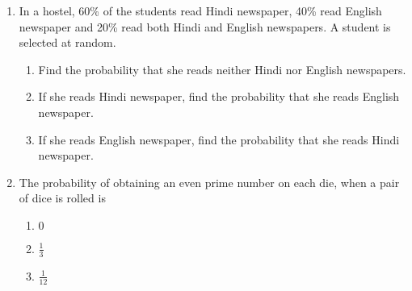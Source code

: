 \begin{enumerate}[label=\thesection.\arabic*,ref=\thesection.\theenumi]
\item In a hostel, 60\% of the students read Hindi newspaper, 40\% read English newspaper and 20\% read both Hindi and English newspapers. A student is selected at random.
		\label{ncert/12/13/2/15}
\begin{enumerate}
\item Find the probability that she reads neither Hindi nor English newspapers.
\item If she reads Hindi newspaper, find the probability that she reads English newspaper.
\item If she reads English newspaper, find the probability that she reads Hindi newspaper.\\
\end{enumerate}
\item The probability of obtaining an even prime number on each die, when a pair of dice is rolled is 
\begin{enumerate}
    \item $0$ 
    
    \item $\frac{1}{3}$ 
    
    \item $\frac{1}{12}$ 
    

\end{enumerate}
\end{enumerate}
